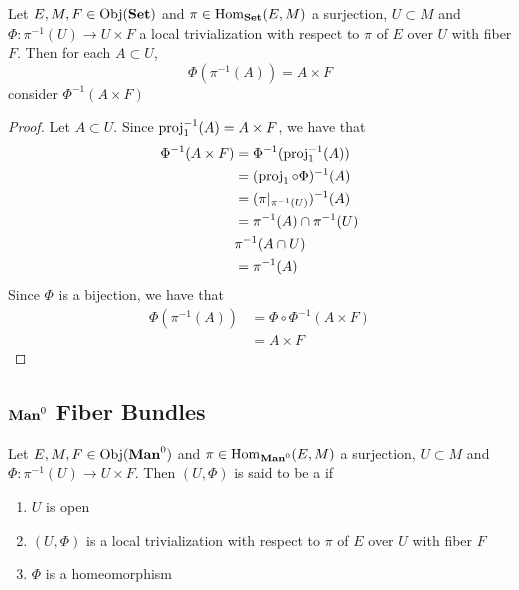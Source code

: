 \documentclass{book}
\begin{document}
	\begin{ex} 
		Let $E, M, F \in \operatorname{Obj}(\operatorname*{\text{\textbf{Set}}})$ and $\pi \in \operatorname{Hom}_{\operatorname*{\text{\textbf{Set}}}}(E, M)$ a surjection, $U \subset M$ and $\Phi: \pi^{-1}(U) \rightarrow U \times F$ a local trivialization with respect to $\pi$ of $E$ over $U$ with fiber $F$. Then for each $A \subset U$, $$\Phi( \pi^{-1}(A)) = A \times F$$
		 consider $\Phi^{-1}(A \times F)$ 
	\end{ex}
	
	\begin{proof}
		Let $A \subset U$. Since $\operatorname{\text{proj}}_1^{-1}(A) = A \times F$, we have that 
		\begin{align*}
			\Phi^{-1}(A \times F)
			& = \Phi^{-1}(\operatorname{\text{proj}}_1^{-1}(A)) \\
			& = (\operatorname{\text{proj}}_1 \circ \Phi)^{-1}(A) \\
			& = (\pi|_{\pi^{-1}(U)})^{-1}(A) \\
			& = \pi^{-1}(A) \cap \pi^{-1}(U) \\
			&  \pi^{-1}(A \cap U) \\
			& = \pi^{-1}(A)
		\end{align*}
		Since $\Phi$ is a bijection, we have that
		\begin{align*}
			\Phi (\pi^{-1}(A))
			&= \Phi \circ \Phi^{-1}(A \times F) \\
			&= A \times F
		\end{align*}
	\end{proof}














	
	\subsection{$\Man0$ Fiber Bundles}
	
	\begin{defn} 
		Let $E, M, F \in \Obj(\Man0)$ and $\pi \in \Hom_{\Man0}(E, M)$ a surjection, $U \subset M$ and $\Phi: \pi^{-1}(U) \rightarrow U \times F$. Then $(U, \Phi)$ is said to be a   if 
		\begin{enumerate}
			\item $U$ is open
			\item $(U, \Phi)$ is a local trivialization with respect to $\pi$ of $E$ over $U$ with fiber $F$
			\item $\Phi$ is a homeomorphism
		\end{enumerate}
	\end{defn}
 
\end{document}
